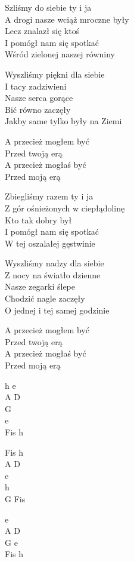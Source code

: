 \begin{text}
    Szliśmy do siebie ty i ja\\
    A drogi nasze wciąż mroczne były\\
    Lecz znalazł się ktoś\\
    I pomógł nam się spotkać\\
    Wśród zielonej naszej równiny

    Wyszliśmy piękni dla siebie\\
    I tacy zadziwieni\\
    Nasze serca gorące\\
    Bić równo zaczęły\\
    Jakby same tylko były na Ziemi

    A przecież mogłem być\\
    Przed twoją erą\\
    A przecież mogłaś być\\
    Przed moją erą

    Zbiegliśmy razem ty i ja\\
    Z gór ośnieżonych w ciepłądolinę\\
    Kto tak dobry był\\
    I pomógł nam się spotkać\\
    W tej oszalałej gęstwinie

    Wyszliśmy nadzy dla siebie\\
    Z nocy na światło dzienne\\
    Nasze zegarki ślepe\\
    Chodzić nagle zaczęły\\
    O jednej i tej samej godzinie

    A przecież mogłem być\\
    Przed twoją erą\\
    A przecież mogłaś być\\
    Przed moją erą
\end{text}
\begin{chord}
    h e\\
    A D\\
    G\\
    e\\
    Fis h

    Fis h\\
    A D\\
    e\\
    h\\
    G Fis

    e\\
    A D\\
    G e\\
    Fis h
\end{chord}